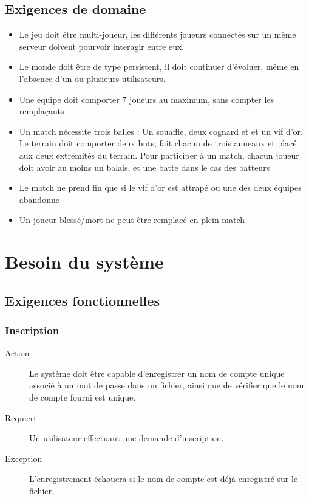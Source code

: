 \documentclass[a4paper]{article}
\begin{document}
\subsection{Exigences de domaine}
\begin{itemize}
\item Le jeu doit être multi-joueur, les différents joueurs connectés sur un même serveur doivent pourvoir interagir entre eux.
\item Le monde doit être de type persistent, il doit continuer d'évoluer, même en l'absence d'un ou plusieurs utilisateurs.
\item Une équipe doit comporter 7 joueurs au maximum, sans compter les remplaçants
\item Un match nécessite trois balles : Un souaffle, deux cognard et  et un vif d'or. Le terrain doit comporter deux buts, fait chacun de trois anneaux et placé aux deux extrémités du terrain. Pour participer à un match, chacun joueur doit avoir au moins un balais, et une batte dans le cas des batteurs
\item Le match ne prend fin que si le vif d'or est attrapé ou une des deux équipes abandonne
\item Un joueur blessé/mort ne peut être remplacé en plein match 
\end{itemize}


\section{Besoin du système}
\subsection{Exigences fonctionnelles}

\subsubsection{Inscription}
\begin{description}
\item[Action] Le système doit être capable d'enregistrer un nom de compte unique associé à un mot de passe dans un fichier, ainsi que de vérifier que le nom de compte fourni est unique.
\item[Requiert] Un utilisateur effectuant une demande d'inscription.
\item[Exception] L'enregistrement échouera si le nom de compte est déjà enregistré sur le fichier.
\end{description}
\end{document}
